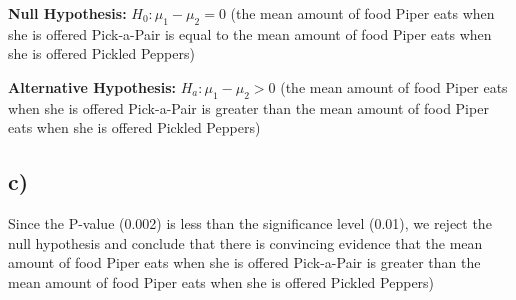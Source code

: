 \documentclass{article}
\begin{document}
\textbf{Null Hypothesis:} $H_0: \mu_1 - \mu_2 = 0$ (the mean amount of food Piper eats when she is offered Pick-a-Pair is equal to the mean amount of food Piper eats when she is offered Pickled Peppers)

\noindent\textbf{Alternative Hypothesis:} $H_a: \mu_1 - \mu_2 > 0$ (the mean amount of food Piper eats when she is offered Pick-a-Pair is greater than the mean amount of food Piper eats when she is offered Pickled Peppers)

\subsection*{c)}
Since the P-value (0.002) is less than the significance level (0.01), we reject the null hypothesis and
conclude that there is convincing evidence that the mean amount of food Piper eats when she is offered 
Pick-a-Pair is greater than the mean amount of food Piper eats when she is offered Pickled Peppers)
\end{document}
